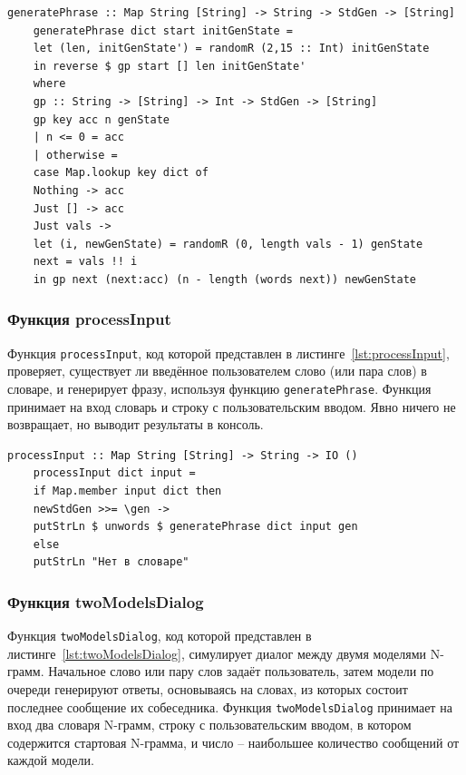 \documentclass[a4paper, final]{article}
\begin{document}
\begin{lstlisting}[caption={Функция generatePhrase для генерации фразы}, label={lst:generatePhrase}]
	generatePhrase :: Map String [String] -> String -> StdGen -> [String]
	generatePhrase dict start initGenState =
	let (len, initGenState') = randomR (2,15 :: Int) initGenState
	in reverse $ gp start [] len initGenState'
	where
	gp :: String -> [String] -> Int -> StdGen -> [String]
	gp key acc n genState
	| n <= 0 = acc
	| otherwise =
	case Map.lookup key dict of
	Nothing -> acc
	Just [] -> acc
	Just vals ->
	let (i, newGenState) = randomR (0, length vals - 1) genState
	next = vals !! i
	in gp next (next:acc) (n - length (words next)) newGenState
\end{lstlisting}


\subsubsection{Функция processInput}
Функция \texttt{processInput}, код которой представлен в листинге~\ref{lst:processInput}, проверяет, существует ли введённое пользователем слово (или пара слов) в словаре, и генерирует фразу, используя функцию \texttt{generatePhrase}. Функция принимает на вход словарь и строку с пользовательским вводом. Явно ничего не возвращает, но выводит результаты в консоль.

\begin{lstlisting}[caption={Функция processInput для обработки пользовательского ввода}, label={lst:processInput}]
	processInput :: Map String [String] -> String -> IO ()
	processInput dict input =
	if Map.member input dict then
	newStdGen >>= \gen ->
	putStrLn $ unwords $ generatePhrase dict input gen
	else
	putStrLn "Нет в словаре"
\end{lstlisting}

\subsubsection{Функция twoModelsDialog}

Функция \texttt{twoModelsDialog}, код которой представлен в листинге~\ref{lst:twoModelsDialog}, симулирует диалог между двумя моделями N-грамм. Начальное слово или пару слов задаёт пользователь, затем модели по очереди генерируют ответы, основываясь на словах, из которых состоит последнее сообщение их собеседника. Функция \texttt{twoModelsDialog} принимает на вход два словаря N-грамм, строку с пользовательским вводом, в котором содержится стартовая N-грамма, и число -- наибольшее количество сообщений от каждой модели.
\end{document}

